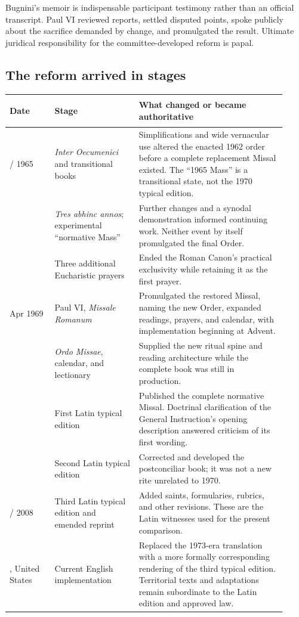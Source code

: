 Bugnini's memoir is indispensable participant testimony rather than an official transcript. Paul VI reviewed reports, settled disputed points, spoke publicly about the sacrifice demanded by change, and promulgated the result. Ultimate juridical responsibility for the committee-developed reform is papal.

\subsection{The reform arrived in stages}

\begin{longtable}{>{\bfseries\raggedright\arraybackslash}p{0.15\linewidth}>{\raggedright\arraybackslash}p{0.28\linewidth}>{\raggedright\arraybackslash}p{0.49\linewidth}}
\toprule
\textbf{Date} & \textbf{Stage} & \textbf{What changed or became authoritative}\\
\midrule
\endhead
1964 / 1965 & \emph{Inter Oecumenici} and transitional books & Simplifications and wide vernacular use altered the enacted 1962 order before a complete replacement Missal existed. The “1965 Mass” is a transitional state, not the 1970 typical edition.\\
1967 & \emph{Tres abhinc annos}; experimental “normative Mass” & Further changes and a synodal demonstration informed continuing work. Neither event by itself promulgated the final Order.\\
1968 & Three additional Eucharistic prayers & Ended the Roman Canon's practical exclusivity while retaining it as the first prayer.\\
3 Apr 1969 & Paul VI, \emph{Missale Romanum} & Promulgated the restored Missal, naming the new Order, expanded readings, prayers, and calendar, with implementation beginning at Advent.\\
1969 & \emph{Ordo Missae}, calendar, and lectionary & Supplied the new ritual spine and reading architecture while the complete book was still in production.\\
1970 & First Latin typical edition & Published the complete normative Missal. Doctrinal clarification of the General Instruction's opening description answered criticism of its first wording.\\
1975 & Second Latin typical edition & Corrected and developed the postconciliar book; it was not a new rite unrelated to 1970.\\
2002 / 2008 & Third Latin typical edition and emended reprint & Added saints, formularies, rubrics, and other revisions. These are the Latin witnesses used for the present comparison.\\
2011, United States & Current English implementation & Replaced the 1973-era translation with a more formally corresponding rendering of the third typical edition. Territorial texts and adaptations remain subordinate to the Latin edition and approved law.\\
\bottomrule
\end{longtable}

